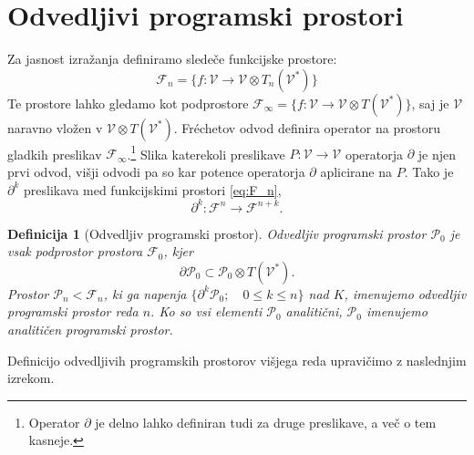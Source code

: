 \documentclass[a4paper, 12pt]{book}
\newcommand{\VV}{\mathcal{V}}
\newcommand{\F}{\mathcal{F}}
\newcommand{\dP}{\mathcal{P}}
\newcommand{\D}{\partial}
\newtheorem{definicija}{Definicija}[chapter]
\begin{document}
\section{Odvedljivi programski prostori}

Za jasnost izražanja definiramo sledeče funkcijske prostore:
 \begin{equation}\label{eq:F_n}
 	\F_n=\{f:\VV\to \VV\otimes T_n(\VV^*)\}
 \end{equation}
Te prostore lahko gledamo kot podprostore $\F_\infty=\{f:\VV\to \VV\otimes
T(\VV^*)\}$, saj je $\VV$ naravno vložen v $\VV\otimes T(\VV^*)$. Fréchetov odvod definira operator na prostoru gladkih preslikav $\F_\infty$.\footnote{Operator $\D$ je delno lahko definiran tudi za druge preslikave, a več o tem kasneje.} Slika katerekoli preslikave $P:\VV\to\VV$ operatorja $\D$ je njen prvi odvod, višji odvodi pa so kar potence operatorja $\D$ aplicirane na $P$. Tako je $\D^k$ preslikava med funkcijskimi prostori \eqref{eq:F_n},
\begin{equation}\label{eq:toFn+k}
 \D^k:\F^n\to\F^{n+k}.
 \end{equation}
\begin{definicija}[Odvedljiv programski prostor]
\emph{Odvedljiv programski prostor} $\dP_0$ je vsak podprostor prostora $\F_0$, kjer
\begin{equation}\label{eq:P}
 	\D\dP_0\subset\dP_0\otimes T(\VV^*).
\end{equation}
Prostor $\dP_n<\F_n$, ki ga napenja $\{\D^k\dP_0;\quad 0\le k\le n\}$ nad $K$, imenujemo \emph{odvedljiv programski prostor reda} $n$. Ko so vsi elementi $\dP_0$ analitični, $\dP_0$ imenujemo \emph{analitičen programski prostor}. 
\end{definicija}
Definicijo odvedljivih programskih prostorov višjega reda upravičimo z naslednjim izrekom.
\end{document}
